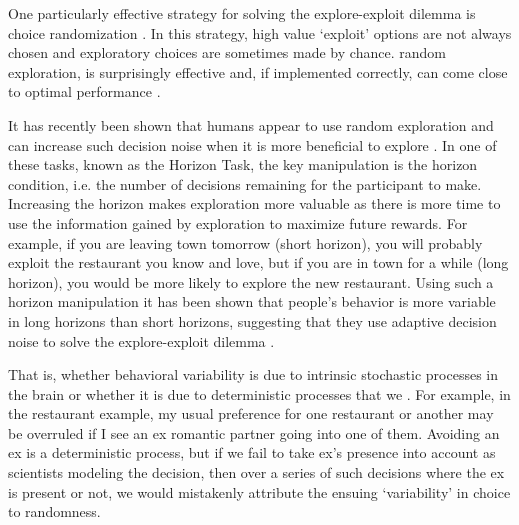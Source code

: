 \documentclass[12pt]{article}
\begin{document}
	One particularly effective strategy for solving the explore-exploit dilemma is choice randomization \citep{eethompson33, eewatkins89, eebridle90} . In this strategy, high value `exploit' options are not always chosen and exploratory choices are sometimes made by chance.   random exploration, is surprisingly effective and, if implemented correctly, can come close to optimal performance \citep{eethompson33, eebridle90, eeAgrawal11, eeChapelle11}.
	
	It has recently been shown that humans appear to use random exploration and can increase such decision noise when it is more beneficial to explore \citep{Gershman2018, wilson2014}. In one of these tasks, known as the Horizon Task, the key manipulation is the horizon condition, i.e. the number of decisions remaining for the participant to make. Increasing the horizon makes exploration more valuable as there is more time to use the information gained by exploration to maximize future rewards. For example, if you are leaving town tomorrow (short horizon), you will probably exploit the restaurant you know and love, but if you are in town for a while (long horizon), you would be more likely to explore the new restaurant. Using such a horizon manipulation it has been shown that people's behavior is more variable in long horizons than short horizons, suggesting that they use adaptive decision noise to solve the explore-exploit dilemma \citep{wilson2014}. 
	
	 That is, whether behavioral variability is due to intrinsic stochastic processes in the brain or whether it is due to deterministic processes that we .  For example, in the restaurant example, my usual preference for one restaurant or another may be overruled if I see an ex romantic partner going into one of them. Avoiding an ex is a deterministic process, but if we fail to take ex's presence into account as scientists modeling the decision, then over a series of such decisions where the ex is present or not, we would mistakenly attribute the ensuing `variability' in choice to randomness.
	
\end{document}
